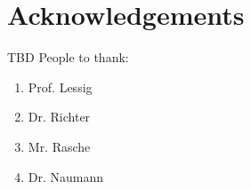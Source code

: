 \documentclass[thesis.tex]{subfiles}
\begin{document}
\chapter*{Acknowledgements}
\label{chap:Acknowledgments}
TBD\linebreak
\linebreak
People to thank:
\begin{enumerate}
	\item Prof. Lessig
	\item Dr. Richter
	\item Mr. Rasche
	\item Dr. Naumann
\end{enumerate}



\newpage
\end{document}
